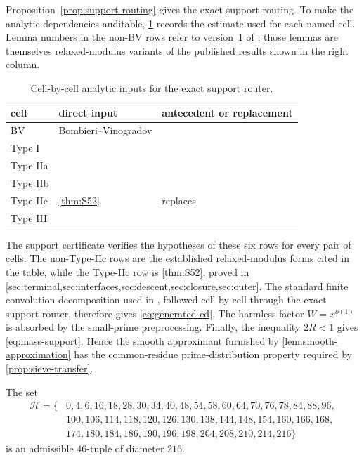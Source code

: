 Proposition~\ref{prop:support-routing} gives the exact support routing.  To
make the analytic dependencies auditable, \cref{tab:support-inputs} records
the estimate used for each named cell.  Lemma numbers in the non-BV rows
refer to version~1 of \cite{Stadlmann2026}; those lemmas are themselves
relaxed-modulus variants of the published results shown in the right column.
\begin{table}[ht]
\small
\begin{tabular}{@{}lll@{}}
\toprule
cell & direct input & antecedent or replacement\\
\midrule
BV & Bombieri--Vinogradov & \cite{PolymathSieve2014}\\
Type I & \cite[Lemma~5]{Stadlmann2026} & \cite[Lemma~5]{BakerIrving2017}\\
Type IIa & \cite[Lemma~3]{Stadlmann2026} &
  \cite[Theorem~2.8(iv)]{PolymathEDZ2014}\\
Type IIb & \cite[Lemma~4]{Stadlmann2026} &
  \cite[Theorem~2.8(ii)]{PolymathEDZ2014}\\
Type IIc & \cref{thm:S52} & replaces
  \cite[Lemma~6]{Stadlmann2026}\\
Type III & \cite[Lemma~7]{Stadlmann2026} &
  \cite[Theorem~2.8(v)]{PolymathEDZ2014}\\
\bottomrule
\end{tabular}
\caption{Cell-by-cell analytic inputs for the exact support router.}
\label{tab:support-inputs}
\end{table}
The support certificate verifies the hypotheses of these six rows for every
pair of cells.  The non-Type-IIc rows are the established relaxed-modulus
forms cited in the table, while the Type-IIc row is \cref{thm:S52}, proved in
\cref{sec:terminal,sec:interfaces,sec:descent,sec:closure,sec:outer}.
The standard finite convolution decomposition used in
\cite[Sections~3--4]{Stadlmann2026}, followed cell by cell through the exact
support router, therefore gives \cref{eq:generated-ed}.  The harmless factor
$W=x^{o(1)}$ is absorbed by the small-prime preprocessing.  Finally, the
inequality $2R<1$ gives \cref{eq:mass-support}.  Hence the smooth approximant
furnished by \cref{lem:smooth-approximation} has the common-residue
prime-distribution property required by \cref{prop:sieve-transfer}.

\begin{lemma}\label{lem:tuple}
The set
\begin{align*}
\mathcal H=\{&
0,4,6,16,18,28,30,34,40,48,54,58,60,64,70,76,78,84,88,96,\\
&100,106,114,118,120,126,130,138,144,148,154,160,166,168,\\
&174,180,184,186,190,196,198,204,208,210,214,216\}
\end{align*}
is an admissible \(46\)-tuple of diameter \(216\).
\end{lemma}

